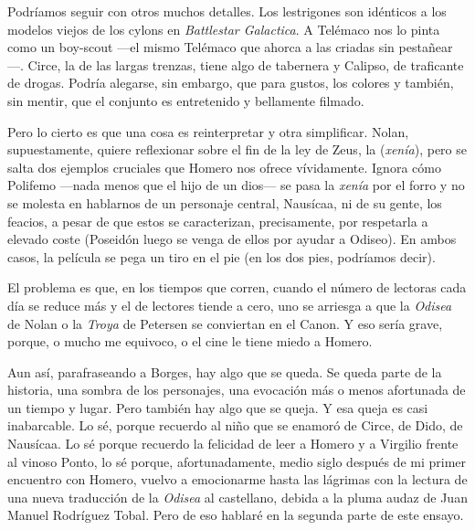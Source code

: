Podríamos seguir con otros muchos detalles. Los lestrigones son idénticos a los modelos viejos de los cylons en \emph{Battlestar Galactica}. A Telémaco nos lo pinta como un boy-scout ---el mismo Telémaco que ahorca a las criadas sin pestañear---. Circe, la de las largas trenzas, tiene algo de tabernera y Calipso, de traficante de drogas. Podría alegarse, sin embargo, que para gustos, los colores y también, sin mentir, que el conjunto es entretenido y bellamente filmado. 

Pero lo cierto es que una cosa es reinterpretar y otra simplificar. Nolan, supuestamente, quiere reflexionar sobre el fin de la ley de Zeus, la  (\emph{xenía}), pero se salta dos ejemplos cruciales que Homero nos ofrece vívidamente. Ignora cómo Polifemo ---nada menos que el hijo de un dios--- se pasa la \emph{xenía} por el forro y no se molesta en hablarnos de un personaje central, Nausícaa, ni de su gente, los feacios, a pesar de que estos se caracterizan, precisamente, por respetarla a elevado coste (Poseidón luego se venga de ellos por ayudar a Odiseo). En ambos casos, la película se pega un tiro en el pie (en los dos pies, podríamos decir). 

El problema es que, en los tiempos que corren, cuando el número de lectoras cada día se reduce más y el de lectores tiende a cero, uno se arriesga a que la \emph{Odisea} de Nolan o la \emph{Troya} de Petersen se conviertan en el Canon. Y eso sería grave, porque, o mucho me equivoco, o el cine le tiene miedo a Homero. 

Aun así, parafraseando a Borges, hay algo que se queda. Se queda parte de la historia, una sombra de los personajes, una evocación más o menos afortunada de un tiempo y lugar. Pero también hay algo que se queja. Y esa queja es casi inabarcable. Lo sé, porque recuerdo al niño que se enamoró de Circe, de Dido, de Nausícaa. Lo sé porque recuerdo la felicidad de leer a Homero y a Virgilio frente al vinoso Ponto, lo sé porque, afortunadamente, medio siglo después de mi primer encuentro con Homero, vuelvo a emocionarme hasta las lágrimas con la lectura de una nueva traducción de la \emph{Odisea} al castellano, debida a la pluma audaz de Juan Manuel Rodríguez Tobal. Pero de eso hablaré en la segunda parte de este ensayo. 


